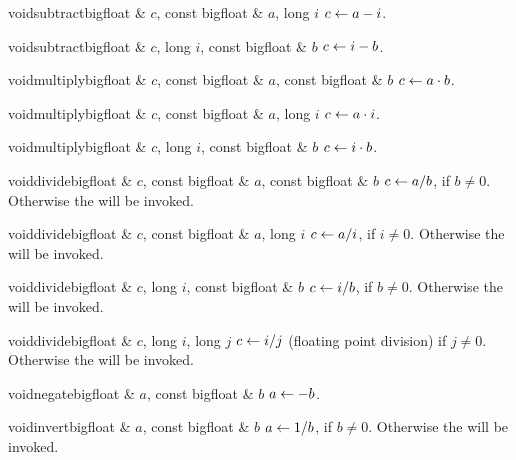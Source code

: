 \begin{fcode}{void}{subtract}{bigfloat & $c$, const bigfloat & $a$, long $i$}
  $c \leftarrow a - i$.
\end{fcode}

\begin{fcode}{void}{subtract}{bigfloat & $c$, long $i$, const bigfloat & $b$}
  $c \leftarrow i - b$.
\end{fcode}

\begin{fcode}{void}{multiply}{bigfloat & $c$, const bigfloat & $a$, const bigfloat & $b$}
  $c \leftarrow a \cdot b$.
\end{fcode}

\begin{fcode}{void}{multiply}{bigfloat & $c$, const bigfloat & $a$, long $i$}
  $c \leftarrow a \cdot i$.
\end{fcode}

\begin{fcode}{void}{multiply}{bigfloat & $c$, long $i$, const bigfloat & $b$}
  $c \leftarrow i \cdot b$.
\end{fcode}

\begin{fcode}{void}{divide}{bigfloat & $c$, const bigfloat & $a$, const bigfloat & $b$}
  $c \leftarrow a / b$, if $b \neq 0$.  Otherwise the \LEH will be invoked.
\end{fcode}

\begin{fcode}{void}{divide}{bigfloat & $c$, const bigfloat & $a$, long $i$}
  $c \leftarrow a / i$, if $i \neq 0$.  Otherwise the \LEH will be invoked.
\end{fcode}

\begin{fcode}{void}{divide}{bigfloat & $c$, long $i$, const bigfloat & $b$}
  $c \leftarrow i / b$, if $b \neq 0$.  Otherwise the \LEH will be invoked.
\end{fcode}

\begin{fcode}{void}{divide}{bigfloat & $c$, long $i$, long $j$}
  $c \leftarrow i / j$ (floating point division) if $j \neq 0$.  Otherwise the \LEH will be invoked.
\end{fcode}

\begin{fcode}{void}{negate}{bigfloat & $a$, const bigfloat & $b$}
  $a \leftarrow -b$.
\end{fcode}

\begin{fcode}{void}{invert}{bigfloat & $a$, const bigfloat & $b$}
  $a \leftarrow 1 / b$, if $b \neq 0$.  Otherwise the \LEH will be invoked.
\end{fcode}


